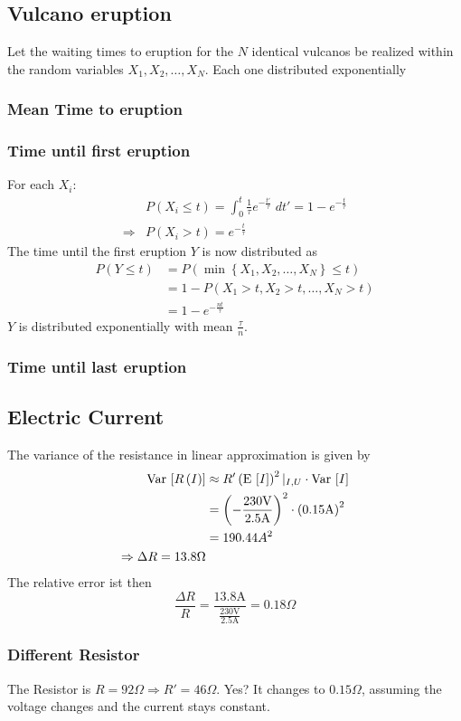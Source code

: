 \subsection{Vulcano eruption}
Let the waiting times to eruption for the $N$ identical vulcanos be realized within
the random variables $X_1, X_2, \dots, X_N$. Each one distributed exponentially
\subsubsection{Mean Time to eruption}
\subsubsection{Time until first eruption}
For each $X_i$:
\begin{align}
    &P\left(X_i\leq t\right)=\int_0^t\frac{1}{\tau}e^{-\frac{t'}{\tau}}\;dt'=1-e^{-\frac{t}{\tau}}
    \\\Rightarrow&P\left(X_i> t\right)=e^{-\frac{t}{\tau}}
\end{align}
The time until the first eruption $Y$ is now distributed as
\begin{align}
    P\left(Y\leq t\right)&=P\left(\min\left\{X_1,X_2,\dots,X_N\right\}\leq t\right)
    \\&=1-P\left(X_1>t, X_2>t,\dots,X_N>t\right)
    \\&=1-e^{-\frac{nt}{\tau}}
\end{align}
$Y$ is  distributed exponentially with mean $\frac{\tau}{n}$.
\subsubsection{Time until last eruption}
\subsection{Electric Current}
The variance of the resistance in linear approximation is given by
\begin{align}
    {\textrm{Var}}\,\left[R\left(I\right)\right]&\approx R'\left({\textrm{E}}\,\left[I\right]\right)^2\vert_{I,U}\cdot{\textrm{Var}}\,\left[I\right]
    \\&= \left(-\frac{230\text{V}}{2.5\text{A}}\right)^2\cdot\left(0.15\text{A}\right)^2
    \\&= 190.44 A^2
    \\\Rightarrow \Delta R = 13.8\Omega
\end{align}
The relative error ist then
\begin{equation}
    \frac{\Delta R}{R}= \frac{13.8 \text{A}}{\frac{230\text{V}}{2.5\text{A}}}=0.18\Omega
\end{equation}
\subsubsection{Different Resistor}
The Resistor is $R=92\Omega \Rightarrow R'=46\Omega$. Yes? It changes to $0.15\Omega$, assuming the voltage changes and the current stays constant.
